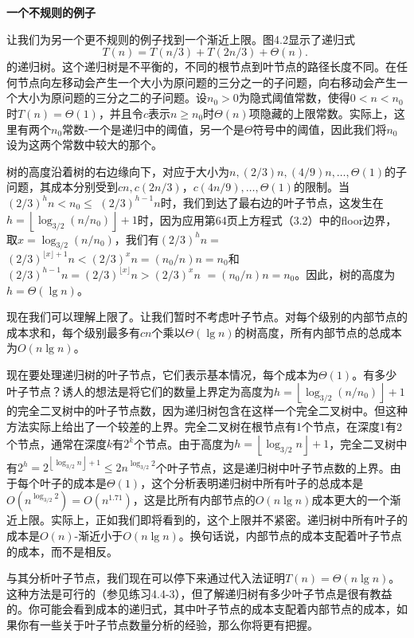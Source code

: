 \documentclass[lang=cn,newtx,10pt,scheme=chinese]{elegantbook}
\begin{document}
\textbf{一个不规则的例子}

让我们为另一个更不规则的例子找到一个渐近上限。图4.2显示了递归式
$$
T(n)=T(n / 3)+T(2 n / 3)+\Theta(n) \text {. }
$$
的递归树。这个递归树是不平衡的，不同的根节点到叶节点的路径长度不同。在任何节点向左移动会产生一个大小为原问题的三分之一的子问题，向右移动会产生一个大小为原问题的三分之二的子问题。设$n_0>0$为隐式阈值常数，使得$0<n<n_0$时$T(n)=\Theta(1)$，并且令$c$表示$n \geq n_0$时$\Theta(n)$项隐藏的上限常数。实际上，这里有两个$n_0$常数-一个是递归中的阈值，另一个是$\Theta$符号中的阈值，因此我们将$n_0$设为这两个常数中较大的那个。

树的高度沿着树的右边缘向下，对应于大小为$n,(2 / 3) n,(4 / 9) n, \ldots, \Theta(1)$的子问题，其成本分别受到$c n, c(2 n / 3)$，$c(4 n / 9), \ldots, \Theta(1)$的限制。当$(2 / 3)^h n<n_0 \leq$ $(2 / 3)^{h-1} n$时，我们到达了最右边的叶子节点，这发生在$h=\left\lfloor\log _{3 / 2}\left(n / n_0\right)\right\rfloor+1$时，因为应用第64页上方程式（3.2）中的floor边界，取$x=\log _{3 / 2}\left(n / n_0\right)$，我们有$(2 / 3)^h n=$ $(2 / 3)^{\lfloor x\rfloor+1} n<(2 / 3)^x n=\left(n_0 / n\right) n=n_0$和$(2 / 3)^{h-1} n=(2 / 3)^{\lfloor x\rfloor} n>(2 / 3)^x n$ $=\left(n_0 / n\right) n=n_0$。因此，树的高度为$h=\Theta(\lg n)$。

现在我们可以理解上限了。让我们暂时不考虑叶子节点。对每个级别的内部节点的成本求和，每个级别最多有$c n$个乘以$\Theta(\lg n)$的树高度，所有内部节点的总成本为$O(n \lg n)$。

现在要处理递归树的叶子节点，它们表示基本情况，每个成本为$\Theta(1)$。有多少叶子节点？诱人的想法是将它们的数量上界定为高度为$h=\left\lfloor\log _{3 / 2}\left(n / n_0\right)\right\rfloor+1$的完全二叉树中的叶子节点数，因为递归树包含在这样一个完全二叉树中。但这种方法实际上给出了一个较差的上界。完全二叉树在根节点有1个节点，在深度1有2个节点，通常在深度$k$有$2^k$个节点。由于高度为$h=\left\lfloor\log _{3 / 2} n\right\rfloor+1$，完全二叉树中有$2^h=2^{\left\lfloor\log _{3 / 2} n\right\rfloor+1} \leq 2 n^{\log _{3 / 2} 2}$个叶子节点，这是递归树中叶子节点数的上界。由于每个叶子的成本是$\Theta(1)$，这个分析表明递归树中所有叶子的总成本是$O\left(n^{\log _{3 / 2} 2}\right)=O\left(n^{1.71}\right)$，这是比所有内部节点的$O(n \lg n)$成本更大的一个渐近上限。实际上，正如我们即将看到的，这个上限并不紧密。递归树中所有叶子的成本是$O(n)$-渐近小于$O(n \lg n)$。换句话说，内部节点的成本支配着叶子节点的成本，而不是相反。

与其分析叶子节点，我们现在可以停下来通过代入法证明$T(n)=\Theta(n \lg n)$。这种方法是可行的（参见练习4.4-3），但了解递归树有多少叶子节点是很有教益的。你可能会看到成本的递归式，其中叶子节点的成本支配着内部节点的成本，如果你有一些关于叶子节点数量分析的经验，那么你将更有把握。
\end{document}
